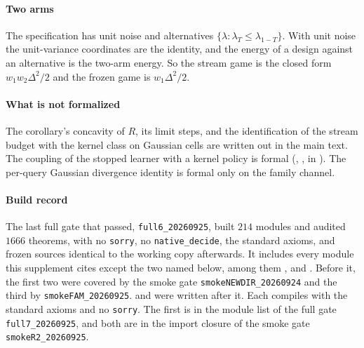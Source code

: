 \paragraph{Two arms} The specification has unit noise and alternatives
$\{\lambda:\lambda_T\le\lambda_{1-T}\}$. With unit noise the unit-variance coordinates are the
identity, and the energy of a design against an alternative is the two-arm energy. So the
stream game is the closed form $w_1w_2\Delta^2/2$ and the frozen game is $w_1\Delta^2/2$.

\paragraph{What is not formalized} The corollary's concavity of $R$, its limit steps, and the
identification of the stream budget with the kernel class on Gaussian cells are written out in
the main text. The coupling of the stopped learner with a kernel policy is formal
(, ,  in ).
The per-query Gaussian divergence identity is formal only on the family channel.

\paragraph{Build record} The last full gate that passed, \texttt{full6\_20260925}, built $214$
modules and audited $1666$ theorems, with no \texttt{sorry}, no \texttt{native\_decide}, the
standard axioms, and frozen sources identical to the working copy afterwards. It includes every
module this supplement cites except the two named below, among
them ,  and
. Before it, the first two were covered by the smoke gate
\texttt{smokeNEWDIR\_20260924} and the third by \texttt{smokeFAM\_20260925}.
 and  were written after it.
Each compiles with the standard axioms and no \texttt{sorry}. The first is in the module list of the
full gate \texttt{full7\_20260925}, and both are in the import closure of the smoke gate
\texttt{smokeR2\_20260925}.


